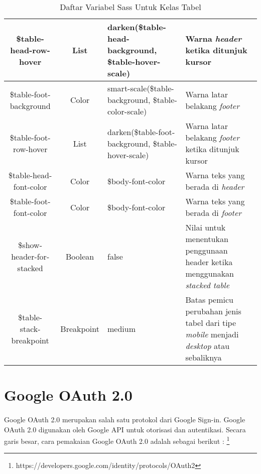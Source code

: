 \begin{center}
\begin{table}[H]
\begin{tabular}{|c|c|p{4cm}|p{5cm}|}
			 	\hline
			 	\$table-head-row-hover & List & darken(\$table-head-background, \$table-hover-scale) & Warna \textit{header} ketika ditunjuk kursor\\
			 	\hline
			 	\$table-foot-background & Color & smart-scale(\$table-background, \$table-color-scale) & Warna latar belakang \textit{footer} \\
			 	\hline
			 	\$table-foot-row-hover & List & darken(\$table-foot-background, \$table-hover-scale) & Warna latar belakang \textit{footer} ketika ditunjuk kursor \\
			 	\hline
			 	\$table-head-font-color & Color & \$body-font-color & Warna teks yang berada di \textit{header} \\
			 	\hline
			 	\$table-foot-font-color & Color & \$body-font-color & Warna teks yang berada di \textit{footer} \\
			 	\hline
			 	\$show-header-for-stacked & Boolean & false & Nilai untuk menentukan penggunaan header ketika menggunakan \textit{stacked table} \\
			 	\hline
			 	\$table-stack-breakpoint & Breakpoint & medium & Batas pemicu perubahan jenis tabel dari tipe \textit{mobile} menjadi \textit{desktop} atau sebaliknya \\
			 	\hline
	\end{tabular}
	\caption{Daftar Variabel Sass Untuk Kelas Tabel}
	\end{table}
\end{center}

\section{Google OAuth 2.0} %
\label{googleoauth}

\paragraph{} Google OAuth 2.0 merupakan salah satu protokol dari Google Sign-in. Google OAuth 2.0 digunakan oleh Google API untuk otorisasi dan autentikasi. Secara garis besar, cara pemakaian Google OAuth 2.0 adalah sebagai berikut : \footnote{\label{noteOauth}https://developers.google.com/identity/protocols/OAuth2}

